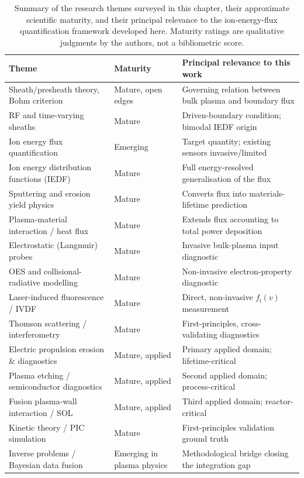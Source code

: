 \begin{table}[htbp]
\centering
\caption{Summary of the research themes surveyed in this chapter, their approximate scientific maturity, and their principal relevance to the ion-energy-flux quantification framework developed here. Maturity ratings are qualitative judgments by the authors, not a bibliometric score.}
\label{tab:theme-maturity}
\begin{tabularx}{\linewidth}{@{}l l X@{}}
\toprule
\textbf{Theme} & \textbf{Maturity} & \textbf{Principal relevance to this work} \\
\midrule
Sheath/presheath theory, Bohm criterion & Mature, open edges & Governing relation between bulk plasma and boundary flux \\
RF and time-varying sheaths & Mature & Driven-boundary condition; bimodal IEDF origin \\
Ion energy flux quantification & Emerging & Target quantity; existing sensors invasive/limited \\
Ion energy distribution functions (IEDF) & Mature & Full energy-resolved generalisation of the flux \\
Sputtering and erosion yield physics & Mature & Converts flux into materials-lifetime prediction \\
Plasma-material interaction / heat flux & Mature & Extends flux accounting to total power deposition \\
Electrostatic (Langmuir) probes & Mature & Invasive bulk-plasma input diagnostic \\
OES and collisional-radiative modelling & Mature & Non-invasive electron-property diagnostic \\
Laser-induced fluorescence / IVDF & Mature & Direct, non-invasive $f_{\mathrm{i}}(v)$ measurement \\
Thomson scattering / interferometry & Mature & First-principles, cross-validating diagnostics \\
Electric propulsion erosion \& diagnostics & Mature, applied & Primary applied domain; lifetime-critical \\
Plasma etching / semiconductor diagnostics & Mature, applied & Second applied domain; process-critical \\
Fusion plasma-wall interaction / SOL & Mature, applied & Third applied domain; reactor-critical \\
Kinetic theory / PIC simulation & Mature & First-principles validation ground truth \\
Inverse problems / Bayesian data fusion & Emerging in plasma physics & Methodological bridge closing the integration gap \\
\bottomrule
\end{tabularx}
\end{table}
